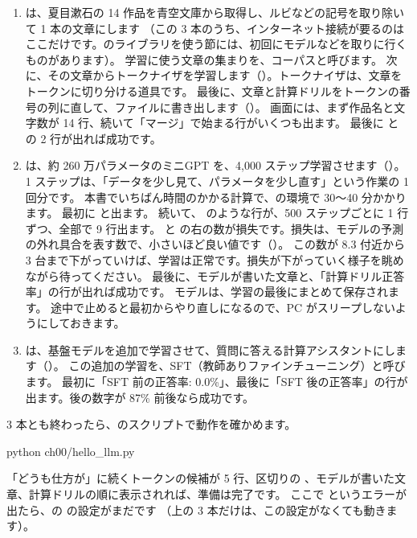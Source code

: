 \begin{enumerate}[leftmargin=2em]
\item {} は、夏目漱石の 14 作品を青空文庫から取得し、ルビなどの記号を取り除いて 1 本の文章にします
  （この 3 本のうち、インターネット接続が要るのはここだけです。のライブラリを使う節には、初回にモデルなどを取りに行くものがあります）。
  学習に使う文章の集まりを、コーパスと呼びます。
  次に、その文章からトークナイザを学習します（）。トークナイザは、文章をトークンに切り分ける道具です。
  最後に、文章と計算ドリルをトークンの番号の列に直して、ファイルに書き出します（）。
  画面には、まず作品名と文字数が 14 行、続いて「マージ」で始まる行がいくつも出ます。
  最後に  と  の 2 行が出れば成功です。
\item {} は、約 260 万パラメータのミニGPT を、4,000 ステップ学習させます（）。
  1 ステップは、「データを少し見て、パラメータを少し直す」という作業の 1 回分です。
  本書でいちばん時間のかかる計算で、の環境で 30〜40 分かかります。
  最初に  と出ます。
  続いて、 のような行が、500 ステップごとに 1 行ずつ、全部で 9 行出ます。
   と  の右の数が損失です。損失は、モデルの予測の外れ具合を表す数で、小さいほど良い値です（）。
  この数が 8.3 付近から 3 台まで下がっていけば、学習は正常です。損失が下がっていく様子を眺めながら待ってください。
  最後に、モデルが書いた文章と、「計算ドリル正答率」の行が出れば成功です。
  モデルは、学習の最後にまとめて保存されます。
  途中で止めると最初からやり直しになるので、PC がスリープしないようにしておきます。
\item {} は、基盤モデルを追加で学習させて、質問に答える計算アシスタントにします（）。
  この追加の学習を、SFT（教師ありファインチューニング）と呼びます。
  最初に「SFT 前の正答率: 0.0\%」、最後に「SFT 後の正答率」の行が出ます。後の数字が 87\% 前後なら成功です。
\end{enumerate}

3 本とも終わったら、のスクリプトで動作を確かめます。

\begin{textcode}
python ch00/hello_llm.py
\end{textcode}

「どうも仕方が」に続くトークンの候補が 5 行、区切りの \code{---}、モデルが書いた文章、計算ドリルの順に表示されれば、準備は完了です。
ここで  というエラーが出たら、の  の設定がまだです
（上の 3 本だけは、この設定がなくても動きます）。

